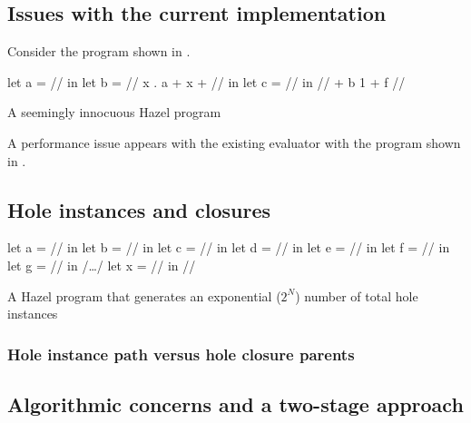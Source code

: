 \subsection{Issues with the current implementation}
\label{sec:current-problems}

Consider the program shown in .

\begin{listing}
  \centering
  \begin{hminted}
let a = // in
let b = /\lbd/ x . { a + x + // } in
let c = // in
// + b 1 + f //
  \end{hminted}
  \caption{A seemingly innocuous Hazel program}
  \label{fig:sample_hazel_program}
\end{listing}

A performance issue appears with the existing evaluator with the program shown in .



\subsection{Hole instances and closures}
\label{sec:hole_instances_and_closures}

\begin{listing}
  \centering
  \begin{hminted}
let a = // in
let b = // in
let c = // in
let d = // in
let e = // in
let f = // in
let g = // in
/\dots/
let x = // in
//
  \end{hminted}
  \caption{A Hazel program that generates an exponential ($2^N$) number of total hole instances}
  \label{fig:hole_renumbering_problem}
\end{listing}

\subsubsection{Hole instance path versus hole closure parents}
\label{sec:closure-parents}



\subsection{Algorithmic concerns and a two-stage approach}
\label{sec:two-stage-renumber}


